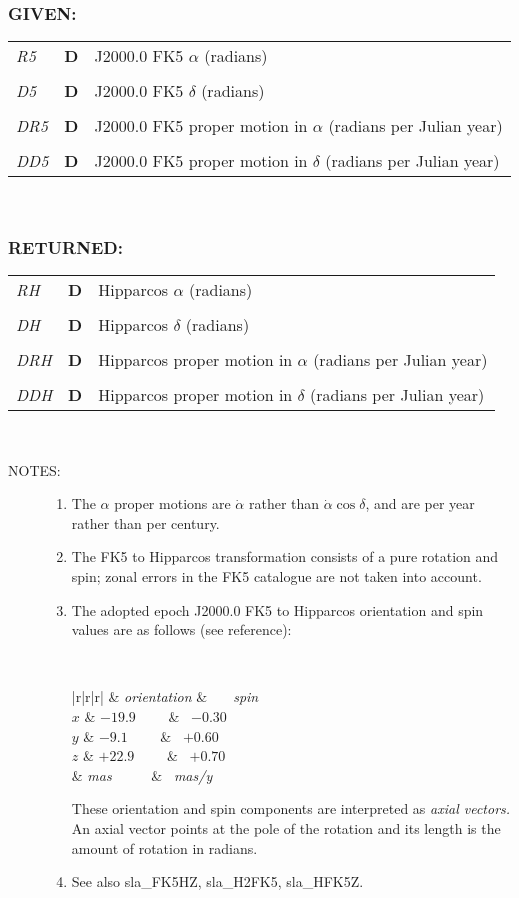 \documentclass[11pt,twoside,nolof]{starlink}
\newcommand{\args}[2]{
  \subsubsection*{#1:}
     \begin{tabular}{p{7em}p{6em}p{22em}}
       #2
     \end{tabular}\\
}
\newcommand{\spec}[3]
{
  \emph{{#1}} & {\textbf{\mbox{#2}}} & {#3} \\
}
\newcommand{\notes}[1]
 {
   \begin{description}
     \item[NOTES:]
         #1
   \end{description}
}
\begin{document}
\args{GIVEN}
{
 \spec{R5}{D}{J2000.0 FK5 $\alpha$ (radians)} \\
 \spec{D5}{D}{J2000.0 FK5 $\delta$ (radians)} \\
 \spec{DR5}{D}{J2000.0 FK5 proper motion in $\alpha$
                              (radians per Julian year)} \\
 \spec{DD5}{D}{J2000.0 FK5 proper motion in $\delta$
                              (radians per Julian year)}
}
\args{RETURNED}
{
 \spec{RH}{D}{Hipparcos $\alpha$ (radians)} \\
 \spec{DH}{D}{Hipparcos $\delta$ (radians)} \\
 \spec{DRH}{D}{Hipparcos proper motion in $\alpha$
                              (radians per Julian year)} \\
 \spec{DDH}{D}{Hipparcos proper motion in $\delta$
                              (radians per Julian year)}
}
\notes
{
 \begin{enumerate}
  \item The $\alpha$ proper motions are $\dot{\alpha}$ rather than
        $\dot{\alpha}\cos\delta$, and are per year rather than per century.
  \item The FK5 to Hipparcos
        transformation consists of a pure rotation and spin;
        zonal errors in the FK5 catalogue are not taken into account.
  \item The adopted epoch J2000.0 FK5 to Hipparcos orientation and spin
        values are as follows (see reference):

        \vspace{2ex}

        ~~~~~~~~~~~~
        \begin{tabular}{|r|r|r|} \hline
        &
        \multicolumn{1}{|c}\textit{orientation} &
        \multicolumn{1}{|c|}\textit{~~~spin~~~} \\ \hline
        $x$ & $-19.9$~~~~ & ~$-0.30$~~ \\
        $y$ &  $-9.1$~~~~ & ~$+0.60$~~ \\
        $z$ & $+22.9$~~~~ & ~$+0.70$~~ \\ \hline
        & \textit{mas}~~~~~ & ~\textit{mas/y}~ \\ \hline
        \end{tabular}

        \vspace{3ex}

        These orientation and spin components are interpreted as
        \textit{axial vectors.}  An axial vector points at the pole of
        the rotation and its length is the amount of rotation in radians.
  \item See also sla\_FK5HZ, sla\_H2FK5, sla\_HFK5Z.
 \end{enumerate}
}
\end{document}
